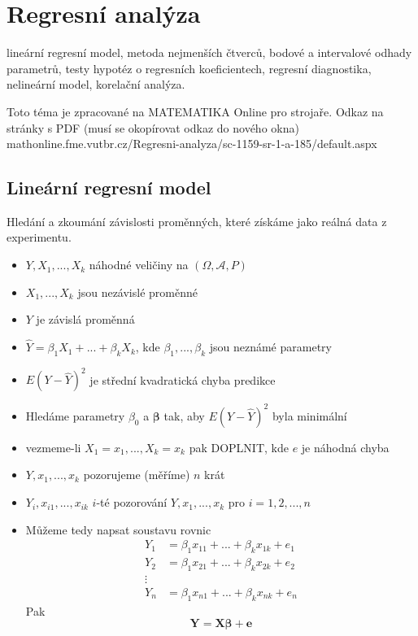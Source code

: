 \documentclass[a4]{report}
\theoremstyle{definition}
\begin{document}
{\newpage
\section{Regresní analýza}



lineární regresní model, metoda nejmenších čtverců, bodové a intervalové odhady parametrů, testy hypotéz o regresních koeficientech, regresní diagnostika, nelineární model, korelační analýza.

Toto téma je zpracované na MATEMATIKA Online pro strojaře. Odkaz na stránky s PDF (musí se okopírovat odkaz do nového okna) mathonline.fme.vutbr.cz/Regresni-analyza/sc-1159-sr-1-a-185/default.aspx

\subsection{Lineární regresní model}
Hledání a zkoumání závislosti proměnných, které získáme jako reálná data z experimentu.

\begin{itemize}
    \item $Y, X_1,..., X_k$ náhodné veličiny na $(\Omega, \pmb{\mathcal{A}}, P)$
    \item $X_1,..., X_k$ jsou nezávislé proměnné
    \item $Y$ je závislá proměnná
    \item $\hat{Y} = \beta_1 X_1 + ... + \beta_k X_k$, kde $\beta_1, ..., \beta_k$ jsou neznámé parametry
    \item $E (Y - \hat{Y})^{2}$ je střední kvadratická chyba predikce
    \item Hledáme parametry $\beta_0$ a $\pmb{\beta}$ tak, aby $E (Y - \hat{Y})^{2}$ byla minimální 
    \item vezmeme-li $X_1 = x_1, ..., X_k = x_k$ pak    DOPLNIT, kde $e$ je náhodná chyba
    \item $Y, x_1,..., x_k$ pozorujeme (měříme) $n$ krát
    \item $Y_i, x_{i1},..., x_{ik}$ $i$-té pozorování $Y, x_1,..., x_k$ pro $i=1,2,...,n$
    \item Můžeme tedy napsat soustavu rovnic \begin{align*}
Y_1 &= \beta_1 x_{11} + ... + \beta_k x_{1k} + e_1 \\
    Y_2 &= \beta_1 x_{21} + ... + \beta_k x_{2k} + e_2 \\
    \vdots \\
    Y_n &= \beta_1 x_{n1} + ... + \beta_k x_{nk} + e_n    
\end{align*} 
    Pak $$\mathbf{Y} = \mathbf{X} \pmb{\beta} + \mathbf{e}$$ 
\end{itemize}

}
\end{document}
